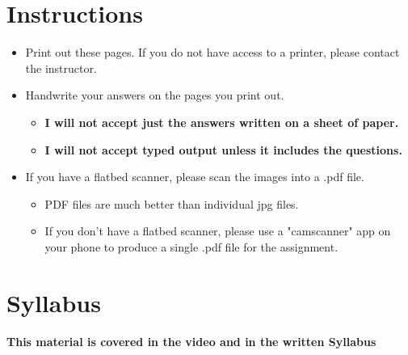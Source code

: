 \documentclass[letterpaper,12pt]{exam}
\begin{document}
\section*{Instructions}
\begin{itemize}
	\item Print out these pages.  If you do not have access to a printer, please contact the instructor.
	\item Handwrite your answers on the pages you print out. 
	   \begin{itemize}
		  \item \textbf{I will not accept just the answers written on a sheet of paper.}  
		  \item \textbf{I will not accept typed output unless it includes the questions.}
	   \end{itemize}
	\item If you have a flatbed scanner, please scan the images into a .pdf file.  
	  \begin{itemize}
         \item PDF files are much better than individual jpg files.
         \item If you don't have a flatbed scanner, please use a "camscanner" app on your phone to produce a single .pdf file for the assignment.
      \end{itemize}
\end{itemize}
\section*{Syllabus}
\begin{center}
	\textbf{This material is covered in the video and in the written Syllabus}
\end{center}
\end{document}

